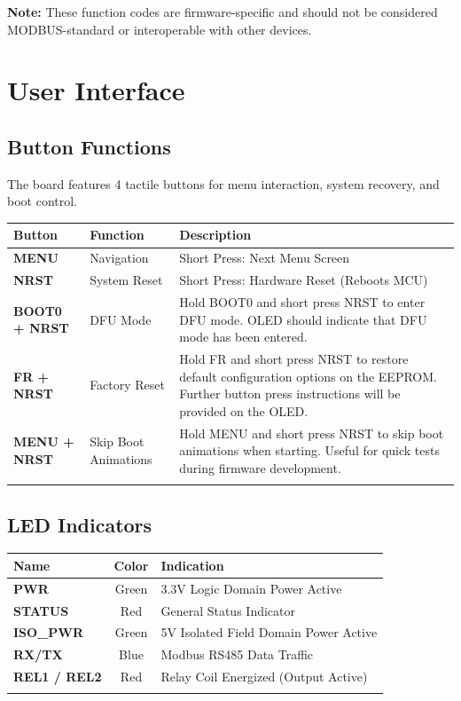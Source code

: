 \documentclass[10pt]{datasheet}
\begin{document}
\textbf{Note:} These function codes are firmware-specific and should not be considered MODBUS-standard or interoperable with other devices.


\section{User Interface}

\subsection{Button Functions}
The board features 4 tactile buttons for menu interaction, system recovery, and boot control.

\begin{table}[h]
\begin{tabularx}{\textwidth}{l | l | X}
    \thickhline
    \textbf{Button} & \textbf{Function} & \textbf{Description} \\
    \hline
    \textbf{MENU} & Navigation & Short Press: Next Menu Screen \\
    \textbf{NRST} & System Reset & Short Press: Hardware Reset (Reboots MCU) \\
    \hline
    \textbf{BOOT0 + NRST} & DFU Mode & Hold BOOT0 and short press NRST to enter DFU mode. OLED should indicate that DFU mode has been entered. \\
    \textbf{FR + NRST} & Factory Reset & Hold FR and short press NRST to restore default configuration options on the EEPROM. Further button press instructions will be provided on the OLED. \\
    \textbf{MENU + NRST} & Skip Boot Animations & Hold MENU and short press NRST to skip boot animations when starting. Useful for quick tests during firmware development. \\
     \thickhline
\end{tabularx}
\end{table}

\subsection{LED Indicators}
\begin{table}[H]
\begin{tabularx}{\textwidth}{l | c | X}
    \thickhline
    \textbf{Name} & \textbf{Color} & \textbf{Indication} \\
    \hline
    \textbf{PWR} & Green & 3.3V Logic Domain Power Active \\
    \textbf{STATUS} & Red & General Status Indicator \\
    \textbf{ISO\_PWR} & Green & 5V Isolated Field Domain Power Active \\
    \textbf{RX/TX} & Blue & Modbus RS485 Data Traffic \\
    \textbf{REL1 / REL2} & Red & Relay Coil Energized (Output Active) \\
    \thickhline
\end{tabularx}
\end{table}
\end{document}
